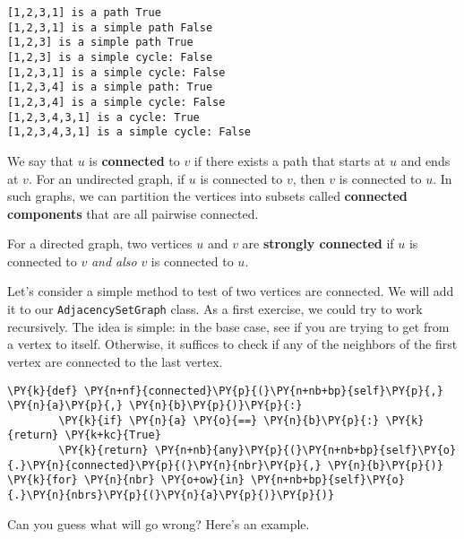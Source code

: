 \begin{Verbatim}
[1,2,3,1] is a path True
[1,2,3,1] is a simple path False
[1,2,3] is a simple path True
[1,2,3] is a simple cycle: False
[1,2,3,1] is a simple cycle: False
[1,2,3,4] is a simple path: True
[1,2,3,4] is a simple cycle: False
[1,2,3,4,3,1] is a cycle: True
[1,2,3,4,3,1] is a simple cycle: False
\end{Verbatim}


We say that $u$ is \textbf{connected} to $v$ if there exists a path that starts at $u$ and ends at $v$.
For an undirected graph, if $u$ is connected to $v$, then $v$ is connected to $u$.
In such graphs, we can partition the vertices into subsets called \textbf{connected components} that are all pairwise connected.  


For a directed graph, two vertices $u$ and $v$ are \textbf{strongly connected} if $u$ is connected to $v$ \emph{and also} $v$ is connected to $u$.


Let's consider a simple method to test of two vertices are connected.
We will add it to our \texttt{AdjacencySetGraph} class.  As a first exercise, we could try to work recursively.  The idea is simple: in the base case, see if you are trying to get from a vertex to itself.  Otherwise, it suffices to check if any of the neighbors of the first vertex are connected to the last vertex.

\begin{Verbatim}[commandchars=\\\{\}]
    \PY{k}{def} \PY{n+nf}{connected}\PY{p}{(}\PY{n+nb+bp}{self}\PY{p}{,} \PY{n}{a}\PY{p}{,} \PY{n}{b}\PY{p}{)}\PY{p}{:}
        \PY{k}{if} \PY{n}{a} \PY{o}{==} \PY{n}{b}\PY{p}{:} \PY{k}{return} \PY{k+kc}{True}
        \PY{k}{return} \PY{n+nb}{any}\PY{p}{(}\PY{n+nb+bp}{self}\PY{o}{.}\PY{n}{connected}\PY{p}{(}\PY{n}{nbr}\PY{p}{,} \PY{n}{b}\PY{p}{)} \PY{k}{for} \PY{n}{nbr} \PY{o+ow}{in} \PY{n+nb+bp}{self}\PY{o}{.}\PY{n}{nbrs}\PY{p}{(}\PY{n}{a}\PY{p}{)}\PY{p}{)}
\end{Verbatim}



Can you guess what will go wrong?
Here's an example.


